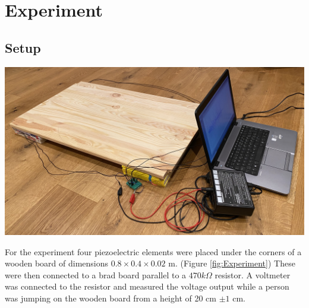 \chapter{Experiment}

\section{Setup}

\begin{minipage}{0.33\textwidth}
    \includegraphics[width=\textwidth]{./Figure_6.jpg}
    \label{fig:Experiment}
\end{minipage}
\begin{minipage}{0.66\textwidth}
    For the experiment four piezoelectric elements were placed under the corners of a wooden board of dimensions $0.8 \times 0.4 \times 0.02$ m. (Figure \ref{fig:Experiment}) These were then connected to a brad board parallel to a $470k\Omega$ resistor. A voltmeter was connected to the resistor and measured the voltage output while a person was jumping on the wooden board from a height of 20 cm $\pm 1$ cm.\\
\end{minipage}

